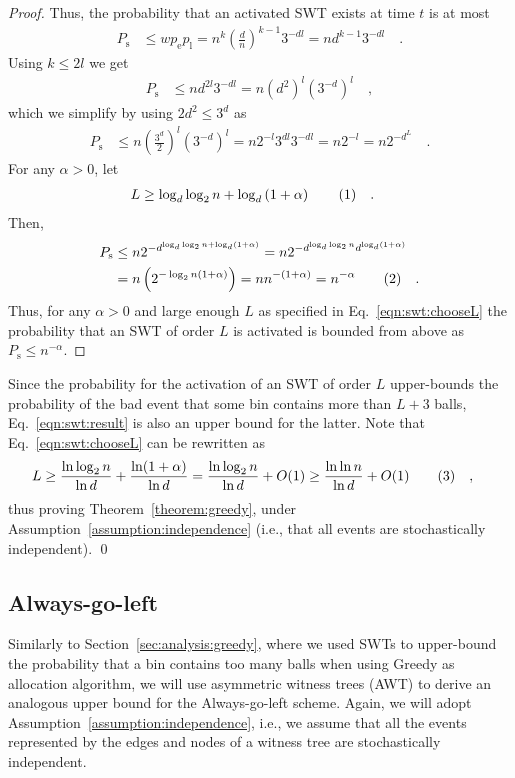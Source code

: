 \documentclass[a4paper,12pt]{article}
\newcommand\numberthis{\addtocounter{equation}{1}\tag{\theequation}}
\newcommand\neqn[1]{\numberthis\label{eqn:#1}}
\begin{document}
\begin{proof}
Thus, the probability that an activated SWT exists at time $t$ is at most 
\begin{align*}
P_\mathrm{s} &\leq w  p_\mathrm{e}  p_\mathrm{l} 
		= n^{k}  \left(\frac{d}{n}\right)^{k-1}  3^{-d  l} 
		= n  d^{k-1}  3^{-d  l}\quad .
\end{align*}
Using $k \leq 2l$ we get
\begin{align*}
P_\mathrm{s} &\leq n  d^{2 l}  3^{-d  l} 
		= n  \left(d^2\right)^l  \left( 3^{-d} \right)^l\quad ,
\end{align*}
which we simplify by using $2d^2 \leq 3^d$ as
\begin{align*}
P_\mathrm{s} &\leq n  \left(\frac{3^d}{2}\right)^l  \left( 3^{-d}\right)^l 
		= n  2^{-l}  3^{d l}  3^{-d  l} 
		= n 2^{-l}		
		= n 2^{-d^L} \quad .		
\end{align*}
For any $\alpha > 0 $, let
\begin{align*}
L &\geq \log_d\log_2 n + \log_d\left(1+\alpha\right) \neqn{swt:chooseL} \quad .
\end{align*}
Then, 
\begin{align*}
P_\mathrm{s} &\leq n  2^{{-d}^{\log_d\log_2 n + \log_d\left(1+\alpha\right)}} 
		= n  2^{-{d}^{\log_d\log_2 n} d^{\log_d \left(1+\alpha\right)}} \\
		&= n  \left( 2^{-\log_2 n  \left(1+ \alpha \right)} \right) 
		= n  n^{-\left(1+\alpha\right)} = n^{-\alpha} \neqn{swt:result}\quad .
\end{align*}
Thus, for any $\alpha>0$ and large enough $L$ as specified in Eq.~\ref{eqn:swt:chooseL} the probability that an SWT of order $L$ is activated is bounded from above as $P_\mathrm{s}\leq n^{-\alpha}$.
\end{proof}

Since the probability for the activation of an SWT of order $L$ upper-bounds the probability of the bad event that some bin contains more than $L+3$ balls, Eq.~\ref{eqn:swt:result} is also an upper bound for the latter. Note that Eq.~\ref{eqn:swt:chooseL} can be rewritten as
\begin{align*}
L &\geq  \frac{\ln\log_2 n}{\ln d} + \frac{\ln(1+\alpha)}{\ln d} 
   = \frac{\ln \log_2 n}{\ln d} +O(1) 
  \geq \frac{\ln \ln n}{\ln d} +O(1) \neqn{swt:boundL} \quad ,
\end{align*}
thus proving Theorem~\ref{theorem:greedy}, under Assumption~\ref{assumption:independence} (i.e., that all events are stochastically independent). \qed

\subsection{Always-go-left}
\label{sec:analysis:alg}
Similarly to Section~\ref{sec:analysis:greedy}, where we used SWTs to upper-bound the probability that a bin contains too many balls when using Greedy as allocation algorithm, we will use asymmetric witness trees (AWT) to derive an analogous upper bound for the Always-go-left scheme. Again, we will adopt Assumption~\ref{assumption:independence}, i.e., we assume that all the events represented by the edges and nodes of a witness tree are stochastically independent.
\end{document}

